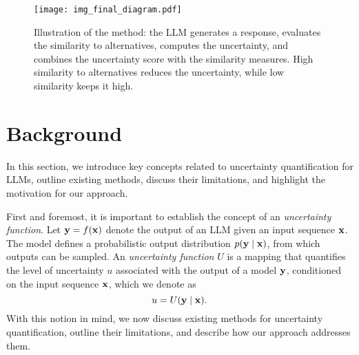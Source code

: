 
  \begin{figure*}[t!]
    \centering
    \texttt{[image: img\_final\_diagram.pdf]}
    \caption{Illustration of the method: the LLM generates a response, evaluates the similarity to alternatives, computes the uncertainty, and combines the uncertainty score with the similarity measures. High similarity to alternatives reduces the uncertainty, while low similarity keeps it high.}
    \label{fig:method}
  \end{figure*}


\section{Background}
  In this section, we introduce key concepts related to uncertainty quantification for LLMs, outline existing methods, discuss their limitations, and highlight the motivation for our approach.

  First and foremost, it is important to establish the concept of an \textit{uncertainty function}. Let $\mathbf{y} = f(\mathbf{x})$ denote the output of an LLM given an input sequence $\mathbf{x}$. The model defines a probabilistic output distribution $p(\mathbf{y} \mid \mathbf{x})$, from which outputs can be sampled. An \textit{uncertainty function} \( U \) is a mapping that quantifies the level of uncertainty $u$ associated with the output of a model \( \mathbf{y} \), conditioned on the input sequence \( \mathbf{x} \), which we denote as
  \begin{equation}
    u = U(\mathbf{y} \mid \mathbf{x}).
  \end{equation}
  With this notion in mind, we now discuss existing methods for uncertainty quantification, outline their limitations, and describe how our approach addresses them.

